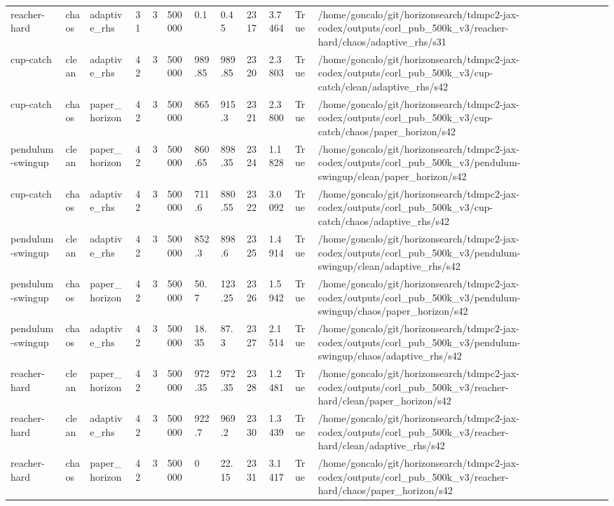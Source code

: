 \begin{tabular}{llllllllllll}
reacher-hard & chaos & adaptive\_rhs & 31 & 3 & 500000 & 0.1 & 0.45 & 2317 & 3.7464 & True & /home/goncalo/git/horizonsearch/tdmpc2-jax-codex/outputs/corl\_pub\_500k\_v3/reacher-hard/chaos/adaptive\_rhs/s31 \\
cup-catch & clean & adaptive\_rhs & 42 & 3 & 500000 & 989.85 & 989.85 & 2320 & 2.3803 & True & /home/goncalo/git/horizonsearch/tdmpc2-jax-codex/outputs/corl\_pub\_500k\_v3/cup-catch/clean/adaptive\_rhs/s42 \\
cup-catch & chaos & paper\_horizon & 42 & 3 & 500000 & 865 & 915.3 & 2321 & 2.3800 & True & /home/goncalo/git/horizonsearch/tdmpc2-jax-codex/outputs/corl\_pub\_500k\_v3/cup-catch/chaos/paper\_horizon/s42 \\
pendulum-swingup & clean & paper\_horizon & 42 & 3 & 500000 & 860.65 & 898.35 & 2324 & 1.1828 & True & /home/goncalo/git/horizonsearch/tdmpc2-jax-codex/outputs/corl\_pub\_500k\_v3/pendulum-swingup/clean/paper\_horizon/s42 \\
cup-catch & chaos & adaptive\_rhs & 42 & 3 & 500000 & 711.6 & 880.55 & 2322 & 3.0092 & True & /home/goncalo/git/horizonsearch/tdmpc2-jax-codex/outputs/corl\_pub\_500k\_v3/cup-catch/chaos/adaptive\_rhs/s42 \\
pendulum-swingup & clean & adaptive\_rhs & 42 & 3 & 500000 & 852.3 & 898.6 & 2325 & 1.4914 & True & /home/goncalo/git/horizonsearch/tdmpc2-jax-codex/outputs/corl\_pub\_500k\_v3/pendulum-swingup/clean/adaptive\_rhs/s42 \\
pendulum-swingup & chaos & paper\_horizon & 42 & 3 & 500000 & 50.7 & 123.25 & 2326 & 1.5942 & True & /home/goncalo/git/horizonsearch/tdmpc2-jax-codex/outputs/corl\_pub\_500k\_v3/pendulum-swingup/chaos/paper\_horizon/s42 \\
pendulum-swingup & chaos & adaptive\_rhs & 42 & 3 & 500000 & 18.35 & 87.3 & 2327 & 2.1514 & True & /home/goncalo/git/horizonsearch/tdmpc2-jax-codex/outputs/corl\_pub\_500k\_v3/pendulum-swingup/chaos/adaptive\_rhs/s42 \\
reacher-hard & clean & paper\_horizon & 42 & 3 & 500000 & 972.35 & 972.35 & 2328 & 1.2481 & True & /home/goncalo/git/horizonsearch/tdmpc2-jax-codex/outputs/corl\_pub\_500k\_v3/reacher-hard/clean/paper\_horizon/s42 \\
reacher-hard & clean & adaptive\_rhs & 42 & 3 & 500000 & 922.7 & 969.2 & 2330 & 1.3439 & True & /home/goncalo/git/horizonsearch/tdmpc2-jax-codex/outputs/corl\_pub\_500k\_v3/reacher-hard/clean/adaptive\_rhs/s42 \\
reacher-hard & chaos & paper\_horizon & 42 & 3 & 500000 & 0 & 22.15 & 2331 & 3.1417 & True & /home/goncalo/git/horizonsearch/tdmpc2-jax-codex/outputs/corl\_pub\_500k\_v3/reacher-hard/chaos/paper\_horizon/s42 \\

\end{tabular}
